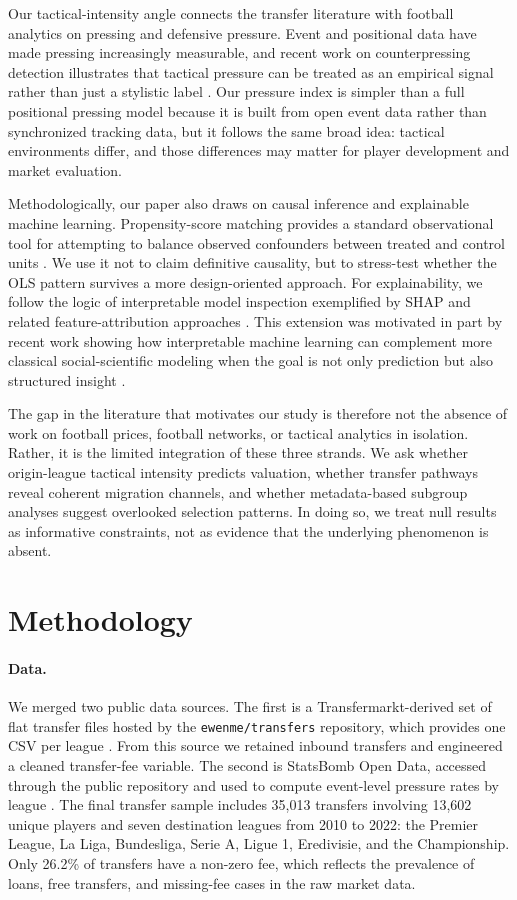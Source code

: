 \documentclass[12pt]{article}
\begin{document}
Our tactical-intensity angle connects the transfer literature with football analytics on pressing and defensive pressure. Event and positional data have made pressing increasingly measurable, and recent work on counterpressing detection illustrates that tactical pressure can be treated as an empirical signal rather than just a stylistic label \cite{bauer2021}. Our pressure index is simpler than a full positional pressing model because it is built from open event data rather than synchronized tracking data, but it follows the same broad idea: tactical environments differ, and those differences may matter for player development and market evaluation.

Methodologically, our paper also draws on causal inference and explainable machine learning. Propensity-score matching provides a standard observational tool for attempting to balance observed confounders between treated and control units \cite{rosenbaum1983}. We use it not to claim definitive causality, but to stress-test whether the OLS pattern survives a more design-oriented approach. For explainability, we follow the logic of interpretable model inspection exemplified by SHAP and related feature-attribution approaches \cite{lundberg2017}. This extension was motivated in part by recent work showing how interpretable machine learning can complement more classical social-scientific modeling when the goal is not only prediction but also structured insight \cite{kim2024}.

The gap in the literature that motivates our study is therefore not the absence of work on football prices, football networks, or tactical analytics in isolation. Rather, it is the limited integration of these three strands. We ask whether origin-league tactical intensity predicts valuation, whether transfer pathways reveal coherent migration channels, and whether metadata-based subgroup analyses suggest overlooked selection patterns. In doing so, we treat null results as informative constraints, not as evidence that the underlying phenomenon is absent.

\section*{Methodology}

\paragraph*{Data.} We merged two public data sources. The first is a Transfermarkt-derived set of flat transfer files hosted by the \texttt{ewenme/transfers} repository, which provides one CSV per league \cite{ewenme}. From this source we retained inbound transfers and engineered a cleaned transfer-fee variable. The second is StatsBomb Open Data, accessed through the public repository and used to compute event-level pressure rates by league \cite{statsbomb}. The final transfer sample includes 35,013 transfers involving 13,602 unique players and seven destination leagues from 2010 to 2022: the Premier League, La Liga, Bundesliga, Serie A, Ligue 1, Eredivisie, and the Championship. Only 26.2\% of transfers have a non-zero fee, which reflects the prevalence of loans, free transfers, and missing-fee cases in the raw market data.
\end{document}
